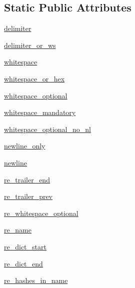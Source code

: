 \subsection*{Static Public Attributes}
\begin{DoxyCompactItemize}
\item 
\hyperlink{classPIL_1_1PdfParser_1_1PdfParser_a32c4ce2deb719fecff698a4850f5c786}{delimiter}
\item 
\hyperlink{classPIL_1_1PdfParser_1_1PdfParser_a7d5aca4f2389b301043407e7deddafe7}{delimiter\+\_\+or\+\_\+ws}
\item 
\hyperlink{classPIL_1_1PdfParser_1_1PdfParser_a9686a6bd66d9a9cb7089f778adec82bc}{whitespace}
\item 
\hyperlink{classPIL_1_1PdfParser_1_1PdfParser_add3d1786c38e1bbce8debe730b0a9a4b}{whitespace\+\_\+or\+\_\+hex}
\item 
\hyperlink{classPIL_1_1PdfParser_1_1PdfParser_a38a18161796dfbd85db1390d7c0baa84}{whitespace\+\_\+optional}
\item 
\hyperlink{classPIL_1_1PdfParser_1_1PdfParser_a00aedd27a8b0305b72d57fb4be12b967}{whitespace\+\_\+mandatory}
\item 
\hyperlink{classPIL_1_1PdfParser_1_1PdfParser_a34caa919a6e2c0e86502f655b5f8f2c2}{whitespace\+\_\+optional\+\_\+no\+\_\+nl}
\item 
\hyperlink{classPIL_1_1PdfParser_1_1PdfParser_a2d47dce67a09e91044d83bb4f2df03fe}{newline\+\_\+only}
\item 
\hyperlink{classPIL_1_1PdfParser_1_1PdfParser_a6412715f04a42af66bc62a01a6db3bab}{newline}
\item 
\hyperlink{classPIL_1_1PdfParser_1_1PdfParser_a4ce25ef4f6a86985e1d6ae3b82814342}{re\+\_\+trailer\+\_\+end}
\item 
\hyperlink{classPIL_1_1PdfParser_1_1PdfParser_a6825efc3b90beacdf94cc968c7f39556}{re\+\_\+trailer\+\_\+prev}
\item 
\hyperlink{classPIL_1_1PdfParser_1_1PdfParser_a7838bd2b40c26c8ccf0ff2f580886a4d}{re\+\_\+whitespace\+\_\+optional}
\item 
\hyperlink{classPIL_1_1PdfParser_1_1PdfParser_adc3c08ad9a5ef615e60049e84055d8ac}{re\+\_\+name}
\item 
\hyperlink{classPIL_1_1PdfParser_1_1PdfParser_ad1a10ff36de5e20915fc9ceccbb1a79b}{re\+\_\+dict\+\_\+start}
\item 
\hyperlink{classPIL_1_1PdfParser_1_1PdfParser_a1e77064229cf2d08bb52c157cc8fde30}{re\+\_\+dict\+\_\+end}
\item 
\hyperlink{classPIL_1_1PdfParser_1_1PdfParser_ac74e30206a2bf6c3f280aa91b3db4bac}{re\+\_\+hashes\+\_\+in\+\_\+name}

\end{DoxyCompactItemize}
